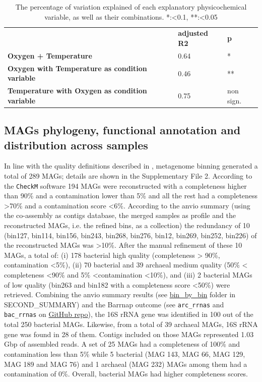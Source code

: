    \begin{table}
      \begin{tabular}{lll}
      \textbf{} & \textbf{adjusted R2} & \textbf{p} \\
      \textbf{Oxygen + Temperature} & 0.64 & * \\
      \textbf{Oxygen with Temperature as condition variable} & 0.46 & ** \\
      \textbf{Temperature with Oxygen as condition variable} & 0.75 & non sign.
      \end{tabular}
      \caption[Physicochemical variables explored]{The percentage of variation explained of each explanatory physicochemical variable, as well as their combinations. *:<0.1, **:<0.05}
      \label{table:psysicochem}
   \end{table}

\subsection{MAGs phylogeny, functional annotation and distribution across samples}

   In line with the quality definitions described in \citep{bowers_minimum_2017}, metagenome binning generated a total of 289 MAGs; 
   details are shown in the Supplementary File 2. 
   According to the \texttt{CheckM} software 194 MAGs were reconstructed with a completeness higher than 90\% and a contamination lower than 5\% and 
   all the rest had a completeness >70\% and a contamination score <6\%. 
   According to the anvio summary (using the co-assembly as contigs database, the merged samples as profile and the reconstructed MAGs, i.e. the refined bins, as a collection) 
   the redundancy of 10 (bin127, bin114, bin156, bin243, bin268, bin276, bin12, bin269, bin252, bin226) of the reconstructed MAGs was >10\%. 
   After the manual refinement of these 10 MAGs, a total of: (i) 178 bacterial high quality (completeness > 90\%, contamination <5\%), 
   (ii) 70 bacterial and 39 archaeal medium quality (50\% < completeness <90\% and 5\% <contamination <10\%), and 
   (iii) 2 bacterial MAGs of low quality (bin263 and bin182 with a completeness score <50\%) were retrieved. 
   Combining the anvio summary results (see \href{https://github.com/hariszaf/karpathos-swamp/tree/main/anvio/SECOND_SUMMARY/bin_by_bin}{bin\_by\_bin} folder in SECOND\_SUMMARY) and 
   the Barrnap outcome (see \texttt{arc\_rrnas} and \texttt{bac\_rrnas} on \href{https://github.com/hariszaf/karpathos-swamp/tree/main/barrnap}{GitHub repo}), 
   the 16S rRNA gene was identified in 100 out of the total 250 bacterial MAGs. 
   Likewise, from a total of 39 archaeal MAGs, 16S rRNA gene was found in 28 of them. 
   Contigs included on those MAGs represented 1.03 Gbp of assembled reads. 
   A set of 25 MAGs had a completeness of 100\% and contamination less than 5\% while 5 bacterial (MAG 143, MAG 66, MAG 129, MAG 189 and MAG 76) 
   and 1 archaeal (MAG 232) MAGs among them had a contamination of 0\%. 
   Overall, bacterial MAGs had higher completeness scores. 


